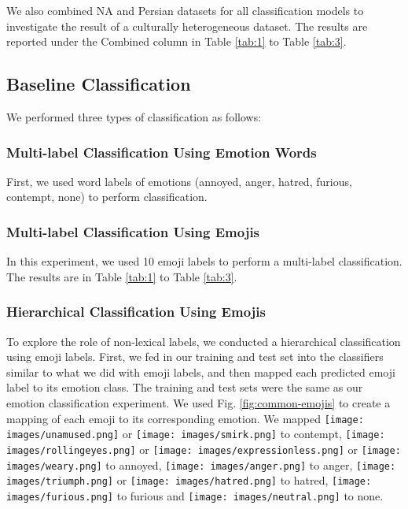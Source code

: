 \documentclass[letterpaper, 10 pt, conference]{ieeeconf}  \usepackage{FG2021}
\begin{document}
We also combined NA and Persian datasets for all classification models to investigate the result of a culturally heterogeneous dataset. The results are reported under the Combined column in Table \ref{tab:1} to Table \ref{tab:3}. 

\subsection{Baseline Classification}
We performed three types of classification as follows:

\subsubsection{Multi-label Classification Using Emotion Words}
First, we used word labels of emotions (annoyed, anger, hatred, furious, contempt, none) to perform classification.

\subsubsection{Multi-label Classification Using Emojis}
In this experiment, we used 10 emoji labels to perform a multi-label classification. The results are in Table \ref{tab:1} to Table \ref{tab:3}. 

\subsubsection{Hierarchical Classification Using Emojis}
To explore the role of non-lexical labels, we conducted a hierarchical classification using emoji labels. First, we fed in our training and test set into the classifiers similar to what we did with emoji labels, and then mapped each predicted emoji label to its emotion class. The training and test sets were the same as our emotion classification experiment. We used Fig. \ref{fig:common-emojis} to create a mapping of each emoji to its corresponding emotion. We mapped \texttt{[image: images/unamused.png]} or \texttt{[image: images/smirk.png]} to contempt, \texttt{[image: images/rollingeyes.png]} or \texttt{[image: images/expressionless.png]} or \texttt{[image: images/weary.png]} to annoyed, \texttt{[image: images/anger.png]} to anger, \texttt{[image: images/triumph.png]} or \texttt{[image: images/hatred.png]} to hatred,  \texttt{[image: images/furious.png]} to furious and \texttt{[image: images/neutral.png]} to none.
\end{document}
